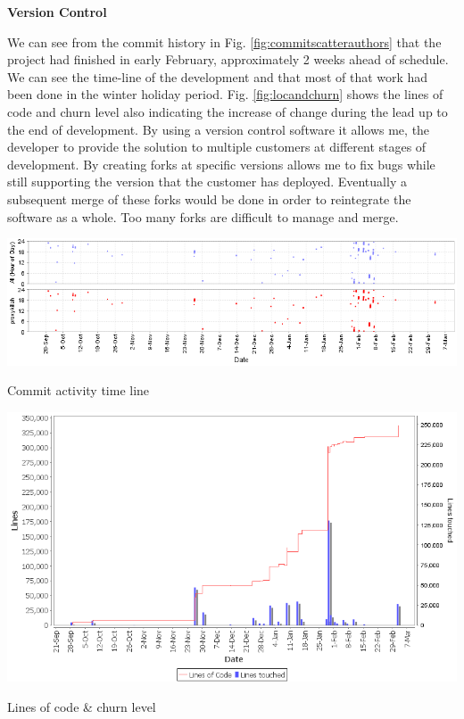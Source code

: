 		\vspace{5mm}
		\large{\bfseries{Version Control}}
				  
		\normalsize
		{
			We can see from the commit history in Fig. \ref{fig:commitscatterauthors} that the project had finished 
			in early February, approximately 2 weeks ahead of schedule.
			\newline
			\newline
			We can see the time-line of the development and that most of that work had been done in the winter holiday period.
			Fig. \ref{fig:locandchurn} shows the lines of code and churn level also indicating the increase
			of change during the lead up to the end of development.
			\newline
			\newline
			By using a version control software it allows me, the developer to provide the solution to 
			multiple customers at different stages of development.  By creating forks at specific versions allows
			me to fix bugs while still supporting the version that the customer has deployed.
			\newline
			\newline
			Eventually a subsequent merge of these forks would be done in order to reintegrate the software as a whole.
			Too many forks are difficult to manage and merge.
			\newline							
		}			
		
		\vspace{5mm}
		\begin{figurehere}
			\centering
			\includegraphics[scale=0.8]{pages/chapter4/figures/commitscatterauthors.png}
			\caption{Commit activity time line}
			\label{fig:commitscatterauthors}
		\end{figurehere}
		
		\vspace{5mm}
		\begin{figurehere}
			\centering
			\includegraphics[scale=0.7]{pages/chapter4/figures/locandchurn.png}
			\caption{Lines of code \& churn level}
			\label{fig:locandchurn}
		\end{figurehere}		
		
